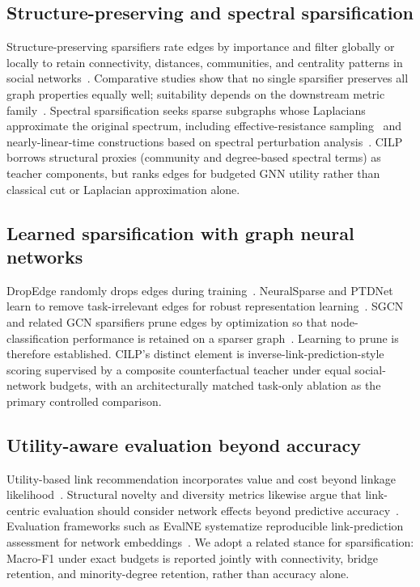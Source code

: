 \subsection{Structure-preserving and spectral sparsification}
Structure-preserving sparsifiers rate edges by importance and filter globally or locally to retain connectivity, distances, communities, and centrality patterns in social networks~\citep{lindner2015structure,hamann2016structure}.
Comparative studies show that no single sparsifier preserves all graph properties equally well; suitability depends on the downstream metric family~\citep{chen2024demystifying}.
Spectral sparsification seeks sparse subgraphs whose Laplacians approximate the original spectrum, including effective-resistance sampling~\citep{spielman2011graph} and nearly-linear-time constructions based on spectral perturbation analysis~\citep{feng2016spectral}.
CILP borrows structural proxies (community and degree-based spectral terms) as teacher components, but ranks edges for budgeted GNN utility rather than classical cut or Laplacian approximation alone.

\subsection{Learned sparsification with graph neural networks}
DropEdge randomly drops edges during training~\citep{rong2020dropedge}.
NeuralSparse and PTDNet learn to remove task-irrelevant edges for robust representation learning~\citep{zheng2020neuralsparse,luo2021ptdnet}.
SGCN and related GCN sparsifiers prune edges by optimization so that node-classification performance is retained on a sparser graph~\citep{li2020sgcn,li2022gcnsparsify}.
Learning to prune is therefore established.
CILP's distinct element is inverse-link-prediction-style scoring supervised by a composite counterfactual teacher under equal social-network budgets, with an architecturally matched task-only ablation as the primary controlled comparison.

\subsection{Utility-aware evaluation beyond accuracy}
Utility-based link recommendation incorporates value and cost beyond linkage likelihood~\citep{li2017utility}.
Structural novelty and diversity metrics likewise argue that link-centric evaluation should consider network effects beyond predictive accuracy~\citep{sanzcruzado2018novelty}.
Evaluation frameworks such as EvalNE systematize reproducible link-prediction assessment for network embeddings~\citep{mara2022evalne}.
We adopt a related stance for sparsification: Macro-F1 under exact budgets is reported jointly with connectivity, bridge retention, and minority-degree retention, rather than accuracy alone.

